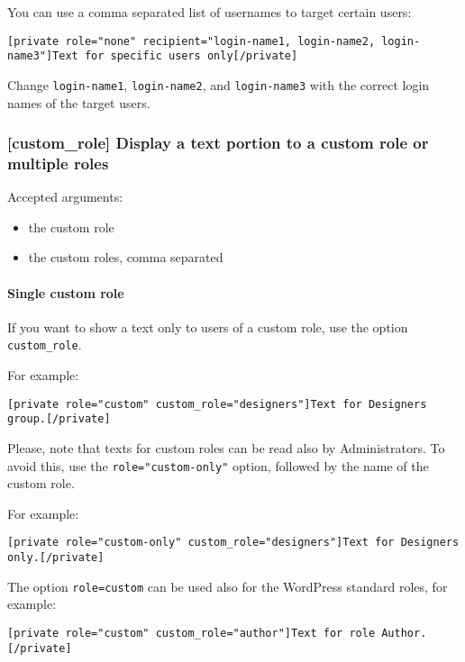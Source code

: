 \documentclass[a4paper,11pt]{article}
\begin{document}
You can use a comma separated list of usernames to target certain users:

\begin{lstlisting}
[private role="none" recipient="login-name1, login-name2, login-name3"]Text for specific users only[/private]
\end{lstlisting}

Change \verb+login-name1+, \verb+login-name2+, and \verb+login-name3+ with the correct login names of the target users.

\subsubsection{[custom\_role] Display a text portion to a custom role or multiple roles}

Accepted arguments:

\begin{itemize}
 \item the custom role
 \item the custom roles, comma separated
\end{itemize}

\paragraph{Single custom role}

If you want to show a text only to users of a custom role, use the option \verb+custom_role+.

For example:

\begin{lstlisting}
[private role="custom" custom_role="designers"]Text for Designers group.[/private]
\end{lstlisting}


Please, note that texts for custom roles can be read also by Administrators. To avoid this, use the \verb+role="custom-only"+ option, followed by the name of the custom role.

For example:

\begin{lstlisting}
[private role="custom-only" custom_role="designers"]Text for Designers only.[/private]
\end{lstlisting}


The option \verb+role=custom+ can be used also for the WordPress standard roles, for example:

\begin{lstlisting}
[private role="custom" custom_role="author"]Text for role Author.[/private]
\end{lstlisting}
\end{document}
